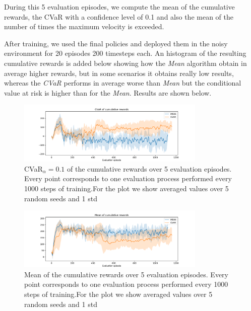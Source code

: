 During this 5 evaluation episodes, we compute the mean of the cumulative rewards,
the CVaR with a confidence level of 0.1 and also the mean of the number of times the 
maximum velocity is exceeded. 

After training, we used the final policies and deployed them in the noisy environment for 20 episodes 
200 timesteps each. An histogram of the resulting cumulative rewards is added below showing
how the \textit{Mean} algorithm obtain in average higher rewards, but in some scenarios it 
obtains really low results, whereas the \textit{CVaR} performs in average worse than \textit{Mean} 
but the conditional value at risk is higher than for the \textit{Mean}.
Results are shown below.



\begin{figure}[ht]
        \centering
        \includegraphics[width=0.8\textwidth]{images/Cheetah_offpolicy_medium/cvar_train_withstds.pdf}
        \caption{CVaR$_\alpha=0.1$ of the cumulative rewards over 5 evaluation episodes.
        Every point corresponds to one evaluation process performed every 1000 steps of training.For the plot we
        show averaged values over 5 random seeds and 1 std}
        \label{cvar_cheetah}
    
\end{figure}

\begin{figure}[ht]
    \centering
    \includegraphics[width=0.8\textwidth]{images/Cheetah_offpolicy_medium/mean_train_withstds.pdf}
    \caption{Mean of the cumulative rewards over 5 evaluation episodes. Every point corresponds
    to one evaluation process performed every 1000 steps of training.For the plot we
    show averaged values over 5 random seeds and 1 std}
    \label{mean_cheetah}

\end{figure}



